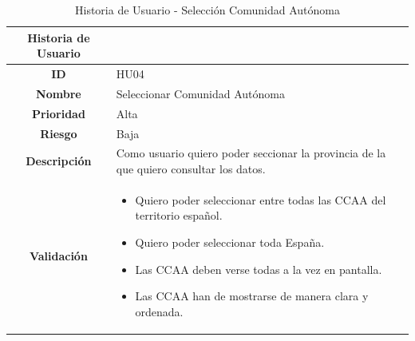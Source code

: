 \begin{table}[H]
	\begin{center}
		\begin{tabular}{| c | p{9cm} |}
			\hline
			
			Historia de Usuario &  \\ \hline
			
			
			\textbf{ID} & HU04 \\
			\textbf{Nombre} & Seleccionar Comunidad Autónoma \\
			\textbf{Prioridad} & Alta \\
			\textbf{Riesgo} & Baja \\
			\textbf{Descripción} & Como usuario quiero poder seccionar la provincia de la que quiero consultar los datos. \\
			\textbf{Validación} & \begin{itemize}
				\item Quiero poder seleccionar entre todas las CCAA del territorio español.
				\item Quiero poder seleccionar toda España.
				\item Las CCAA deben verse todas a la vez en pantalla.
				\item Las CCAA han de mostrarse de manera clara y ordenada.
			\end{itemize} \\ \hline
		\end{tabular}
		\caption{Historia de Usuario - Selección Comunidad Autónoma}
	\end{center}
\end{table}

